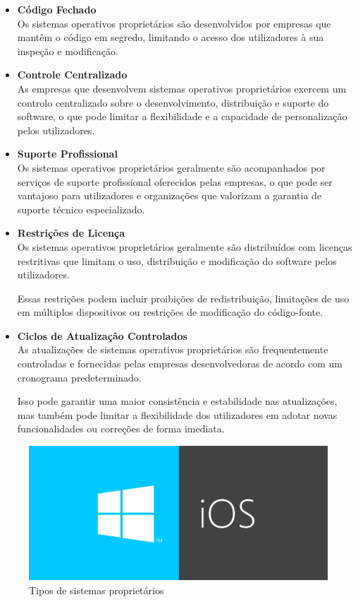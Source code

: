 \begin{itemize}

  \item \textbf{Código Fechado}\\
  Os sistemas operativos proprietários são desenvolvidos por empresas que mantêm o código em segredo, limitando o acesso dos utilizadores à sua inspeção e modificação.
  
  \item \textbf{Controle Centralizado}\\
  As empresas que desenvolvem sistemas operativos proprietários exercem um controlo centralizado sobre o desenvolvimento, distribuição e suporte do software, o que pode limitar a flexibilidade e a capacidade de personalização pelos utilizadores.
  
  \item \textbf{Suporte Profissional}\\
  Os sistemas operativos proprietários geralmente são acompanhados por serviços de suporte profissional oferecidos pelas empresas, o que pode ser vantajoso para utilizadores e organizações que valorizam a garantia de suporte técnico especializado.
  
  \item \textbf{Restrições de Licença}\\
  Os sistemas operativos proprietários geralmente são distribuídos com licenças restritivas que limitam o uso, distribuição e modificação do software pelos utilizadores. 
  
  Essas restrições podem incluir proibições de redistribuição, limitações de uso em múltiplos dispositivos ou restrições de modificação do código-fonte.
  
  \item \textbf{Ciclos de Atualização Controlados}\\
  As atualizações de sistemas operativos proprietários são frequentemente controladas e fornecidas pelas empresas desenvolvedoras de acordo com um cronograma predeterminado. 
  
  Isso pode garantir uma maior consistência e estabilidade nas atualizações, mas também pode limitar a flexibilidade dos utilizadores em adotar novas funcionalidades ou correções de forma imediata.
\end{itemize}

\vspace{2pt}

\begin{figure}[H]
  \centering
  \includegraphics[scale=0.2]{Figures/0. General/sistemas_proprietarios.jpg}
  \caption{Tipos de sistemas proprietários}
  \label{Tipos de sistemas proprietários}
\end{figure}
